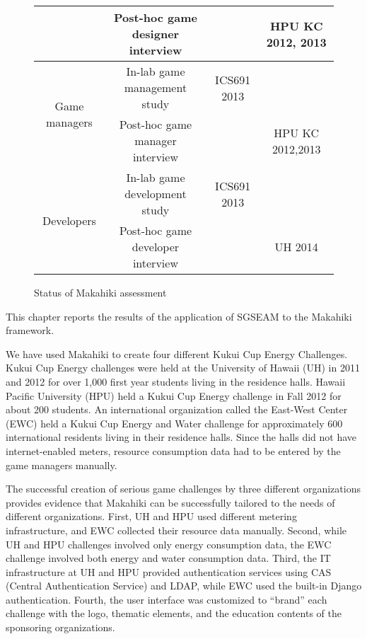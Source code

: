 \begin{figure}[ht!]
\begin{tabular}{|c|c|c|c|}
    \cline{2-4}
    \multicolumn{1}{|p{0.2\columnwidth}|}{} &
    \multicolumn{1}{|p{0.2\columnwidth}|}{Post-hoc game designer interview} &
    \multicolumn{1}{|p{0.3\columnwidth}|}{} &
    \multicolumn{1}{|p{0.2\columnwidth}|}{HPU KC 2012, 2013} \\
    \hline
    \multicolumn{1}{|p{0.2\columnwidth}|}{\multirow{2}{*}{Game managers}} &
    \multicolumn{1}{|p{0.2\columnwidth}|}{In-lab game management study} &
    \multicolumn{1}{|p{0.3\columnwidth}|}{ICS691 2013} &
    \multicolumn{1}{|p{0.2\columnwidth}|}{} \\
    \cline{2-4}
    \multicolumn{1}{|p{0.2\columnwidth}|}{} &
    \multicolumn{1}{|p{0.2\columnwidth}|}{Post-hoc game manager interview} &
    \multicolumn{1}{|p{0.3\columnwidth}|}{} &
    \multicolumn{1}{|p{0.2\columnwidth}|}{HPU KC 2012,2013} \\
    \hline
    \multicolumn{1}{|p{0.2\columnwidth}|}{\multirow{2}{*}{Developers}} &
    \multicolumn{1}{|p{0.2\columnwidth}|}{In-lab game development study} &
    \multicolumn{1}{|p{0.3\columnwidth}|}{ICS691 2013} &
    \multicolumn{1}{|p{0.2\columnwidth}|}{} \\
    \cline{2-4}
    \multicolumn{1}{|p{0.2\columnwidth}|}{} &
    \multicolumn{1}{|p{0.2\columnwidth}|}{Post-hoc game developer interview} &
    \multicolumn{1}{|p{0.3\columnwidth}|}{} &
    \multicolumn{1}{|p{0.2\columnwidth}|}{UH 2014} \\
    \hline
  \end{tabular}
  \caption{Status of Makahiki assessment}
  \label{fig:assessment-overview}
\end{figure}

This chapter reports the results of the application of SGSEAM to the Makahiki framework.

We have used Makahiki to create four different Kukui Cup Energy Challenges. Kukui Cup
Energy challenges were held at the University of Hawaii (UH) in 2011 and 2012 for over
1,000 first year students living in the residence halls. Hawaii Pacific University (HPU)
held a Kukui Cup Energy challenge in Fall 2012 for about 200 students. An international
organization called the East-West Center (EWC) held a Kukui Cup Energy and Water challenge
for approximately 600 international residents living in their residence halls. Since the
halls did not have internet-enabled meters, resource consumption data had to be entered by
the game managers manually.

The successful creation of serious game challenges by three different organizations
provides evidence that Makahiki can be successfully tailored
to the needs of different organizations. First, UH and HPU used different metering
infrastructure, and EWC collected their resource data manually.  Second, while UH and HPU
challenges involved only energy consumption data, the EWC challenge involved both energy
and water consumption data. Third, the IT infrastructure at UH and HPU provided
authentication services using CAS (Central Authentication Service) and LDAP, while EWC
used the built-in Django authentication.  Fourth, the user interface was customized to
``brand'' each challenge with the logo, thematic elements, and the education contents of
the sponsoring organizations.

